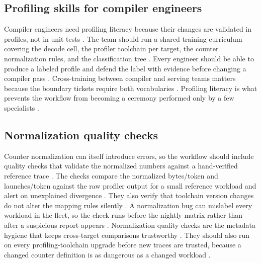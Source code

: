 \subsection{Profiling skills for compiler engineers}

Compiler engineers need profiling literacy because their changes are validated in profiles, not in unit tests \citep{chen2020compilerbasedhardw,patel2025llminference,memoryfloor2026}. The team should run a shared training curriculum covering the decode cell, the profiler toolchain per target, the counter normalization rules, and the classification tree \citep{taxbreak2026,memoryfloor2026}. Every engineer should be able to produce a labeled profile and defend the label with evidence before changing a compiler pass \citep{chen2020compilerbasedhardw,patel2025llminference}. Cross-training between compiler and serving teams matters because the boundary tickets require both vocabularies \citep{kwon2023vllm,memoryfloor2026}. Profiling literacy is what prevents the workflow from becoming a ceremony performed only by a few specialists \citep{patel2025llminference,taxbreak2026}.

\subsection{Normalization quality checks}

Counter normalization can itself introduce errors, so the workflow should include quality checks that validate the normalized numbers against a hand-verified reference trace \citep{chen2020compilerbasedhardw,memoryfloor2026,patel2025llminference}. The checks compare the normalized bytes/token and launches/token against the raw profiler output for a small reference workload and alert on unexplained divergence \citep{taxbreak2026,memoryfloor2026}. They also verify that toolchain version changes do not alter the mapping rules silently \citep{chen2020compilerbasedhardw,patel2025llminference}. A normalization bug can mislabel every workload in the fleet, so the check runs before the nightly matrix rather than after a suspicious report appears \citep{memoryfloor2026,taxbreak2026}. Normalization quality checks are the metadata hygiene that keeps cross-target comparisons trustworthy \citep{patel2025llminference,memoryfloor2026}.
They should also run on every profiling-toolchain upgrade before new traces are trusted, because a changed counter definition is as dangerous as a changed workload \citep{patel2025llminference,memoryfloor2026}.


